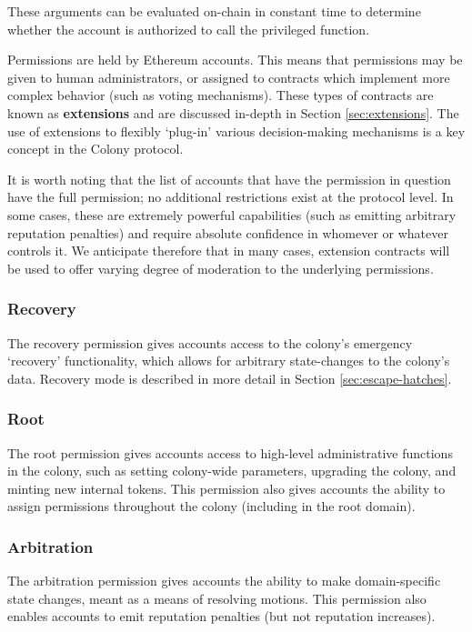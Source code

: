 These arguments can be evaluated on-chain in constant time to determine whether the account is authorized to call the privileged function.

Permissions are held by Ethereum accounts. This means that permissions may be given to human administrators, or assigned to contracts which implement more complex behavior (such as voting mechanisms). These types of contracts are known as \textbf{extensions} and are discussed in-depth in Section \ref{sec:extensions}. The use of extensions to flexibly `plug-in' various decision-making mechanisms is a key concept in the Colony protocol.

It is worth noting that the list of accounts that have the permission in question have the full permission; no additional restrictions exist at the protocol level. In some cases, these are extremely powerful capabilities (such as emitting arbitrary reputation penalties) and require absolute confidence in whomever or whatever controls it. We anticipate therefore that in many cases, extension contracts will be used to offer varying degree of moderation to the underlying permissions.

\subsubsection*{Recovery}

The recovery permission gives accounts access to the colony's emergency `recovery' functionality, which allows for arbitrary state-changes to the colony's data. Recovery mode is described in more detail in Section \ref{sec:escape-hatches}.

\subsubsection*{Root}

The root permission gives accounts access to high-level administrative functions in the colony, such as setting colony-wide parameters, upgrading the colony, and minting new internal tokens. This permission also gives accounts the ability to assign permissions throughout the colony (including in the root domain).

\subsubsection*{Arbitration}

The arbitration permission gives accounts the ability to make domain-specific state changes, meant as a means of resolving motions. This permission also enables accounts to emit reputation penalties (but not reputation increases).

